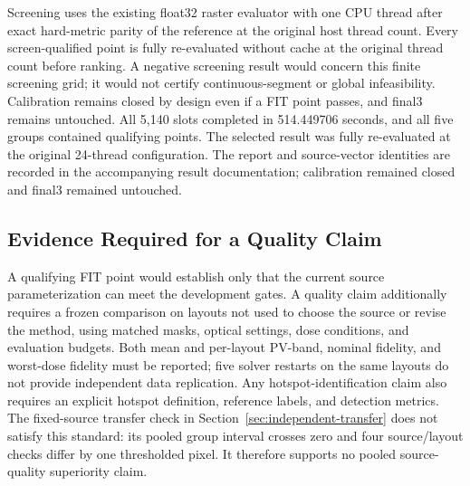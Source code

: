 \documentclass[conference]{IEEEtran}
\begin{document}
Screening uses the existing float32 raster evaluator with one CPU thread after exact hard-metric parity of the reference at the original host thread count. Every screen-qualified point is fully re-evaluated without cache at the original thread count before ranking. A negative screening result would concern this finite screening grid; it would not certify continuous-segment or global infeasibility. Calibration remains closed by design even if a FIT point passes, and final3 remains untouched. All 5,140 slots completed in 514.449706 seconds, and all five groups contained qualifying points. The selected result was fully re-evaluated at the original 24-thread configuration. The report and source-vector identities are recorded in the accompanying result documentation; calibration remained closed and final3 remained untouched.

\subsection{Evidence Required for a Quality Claim}
A qualifying FIT point would establish only that the current source parameterization can meet the development gates. A quality claim additionally requires a frozen comparison on layouts not used to choose the source or revise the method, using matched masks, optical settings, dose conditions, and evaluation budgets. Both mean and per-layout PV-band, nominal fidelity, and worst-dose fidelity must be reported; five solver restarts on the same layouts do not provide independent data replication. Any hotspot-identification claim also requires an explicit hotspot definition, reference labels, and detection metrics. The fixed-source transfer check in Section~\ref{sec:independent-transfer} does not satisfy this standard: its pooled group interval crosses zero and four source/layout checks differ by one thresholded pixel. It therefore supports no pooled source-quality superiority claim.
\end{document}
